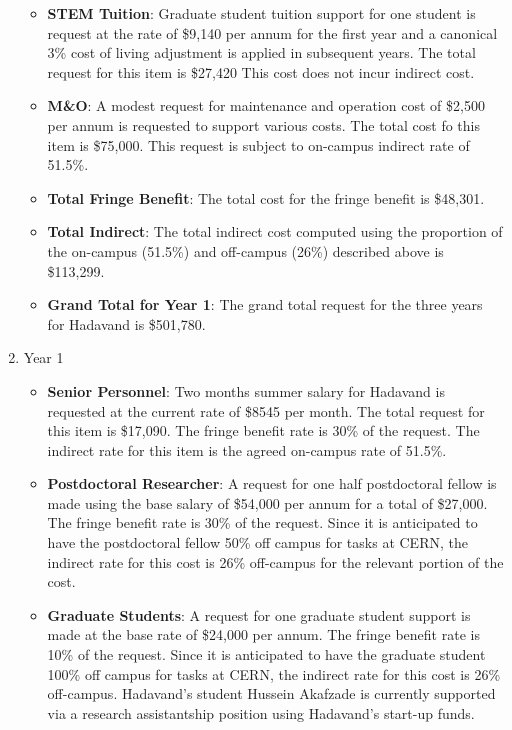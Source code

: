 \begin{enumerate}
\begin{itemize}
\item {{\bf STEM Tuition}: Graduate student tuition support for one student is request at the rate of \$9,140 per annum for the first year and a canonical 3\% cost of living adjustment is applied in subsequent years. The total request for this item is \$27,420  This cost does not incur indirect cost.}

\item {{\bf M\&O}: A modest request for maintenance and operation cost of \$2,500 per annum is requested to support various costs. The total cost fo this item is \$75,000.   This request is subject to on-campus indirect rate of 51.5\%.}

\item {{\bf Total Fringe Benefit}: The total cost for the fringe benefit is \$48,301.}

\item {{\bf Total Indirect}: The total indirect cost computed using the proportion of the on-campus (51.5\%) and off-campus (26\%) described above is \$113,299.}

\item {{\bf Grand Total for Year 1}: The grand total request for the three years for Hadavand is \$501,780.}

\end{itemize}
\item{Year 1}
\begin{itemize}
\item{{\bf Senior Personnel}: Two months summer salary for Hadavand is requested at the current rate of \$8545 per month.  The total request for this item is \$17,090.   The fringe benefit rate is 30\% of the request.  The indirect rate for this item is the agreed on-campus rate of 51.5\%.}

\item {{\bf Postdoctoral Researcher}: A request for one half postdoctoral fellow is made using the base salary of \$54,000 per annum for a total of \$27,000.  The fringe benefit rate is 30\% of the request.  Since it is anticipated to have the postdoctoral fellow 50\% off campus for tasks at CERN, the indirect rate for this cost is 26\% off-campus for the relevant portion of the cost.} 

\item{{\bf Graduate Students}: A request for one graduate student support is made at the base rate of \$24,000 per annum.   The fringe benefit rate is 10\% of the request.  Since it is anticipated to have the graduate student 100\% off campus for tasks at CERN, the indirect rate for this cost is 26\% off-campus.  Hadavand's student Hussein Akafzade is currently supported via a research assistantship position using Hadavand's start-up funds. }


\end{itemize}
\end{enumerate}
